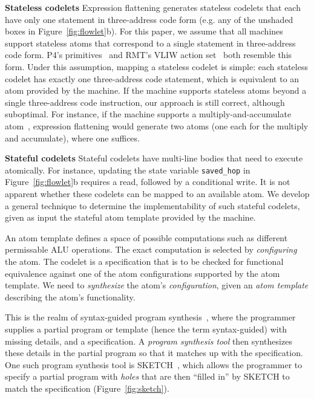 \textbf{Stateless codelets}
Expression flattening generates stateless codelets that each have only one
statement in three-address code form (e.g. any of the unshaded boxes in
Figure~\ref{fig:flowlet}b). For this paper, we assume that all \absmachine
machines support stateless atoms that correspond to a single statement in
three-address code form. P4's primitives~\cite{p4spec} and RMT's VLIW action
set~\cite{rmt} both resemble this form. Under this assumption, mapping a
stateless codelet is simple: each stateless codelet has exactly one
three-address code statement, which is equivalent to an atom provided by the
\absmachine machine. If the \absmachine machine supports stateless atoms beyond
a single three-address code instruction, our approach is still correct,
although suboptimal. For instance, if the \absmachine machine supports a
multiply-and-accumulate atom~\cite{mac}, expression flattening would generate
two atoms (one each for the multiply and accumulate), where one suffices.

\textbf{Stateful codelets}
Stateful codelets have multi-line bodies that need to execute atomically. For
instance, updating the state variable \texttt{saved\_hop} in
Figure~\ref{fig:flowlet}b requires a read, followed by a conditional write.  It
is not apparent whether these codelets can be mapped to an available atom. We
develop a general technique to determine the implementability of such stateful
codelets, given as input the stateful atom template provided by the \absmachine
machine.

An atom template defines a space of possible computations such as different
permissable ALU operations.  The exact computation is selected by
\textit{configuring} the atom. The codelet is a specification that is to be
checked for functional equivalence against one of the atom configurations
supported by the atom template. We need to \textit{synthesize} the atom's
\textit{configuration}, given an \textit{atom template} describing the atom's
functionality.

This is the realm of syntax-guided program synthesis~\cite{sgsyn}, where the
programmer supplies a partial program or template (hence the term
syntax-guided) with missing details, and a specification. A \textit{program
synthesis tool} then synthesizes these details in the partial program so that
it matches up with the specification. One such program synthesis tool is
SKETCH~\cite{bitstreaming, sketch_asplos, sketch_manual}, which allows the
programmer to specify a partial program with \textit{holes} that are then
``filled in'' by SKETCH to match the specification (Figure~\ref{fig:sketch}).

